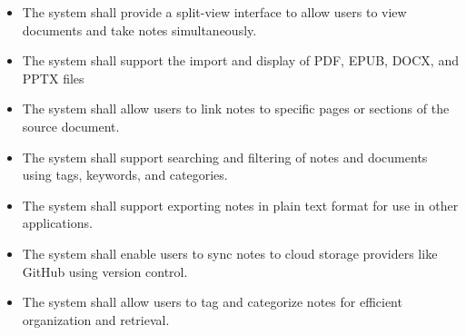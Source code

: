 


\begin{itemize}
    \item The system shall provide a split-view interface to allow users to view documents and take notes simultaneously.
    \item The system shall support the import and display of PDF, EPUB, DOCX, and PPTX files
    \item The system shall allow users to link notes to specific pages or sections of the source document.
    \item The system shall support searching and filtering of notes and documents using tags, keywords, and categories.
    \item The system shall support exporting notes in plain text format for use in other applications.
    \item The system shall enable users to sync notes to cloud storage providers like GitHub using version control.
    \item The system shall allow users to tag and categorize notes for efficient organization and retrieval.
\end{itemize}

